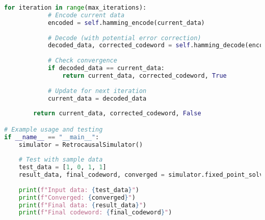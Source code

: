 \documentclass[12pt,a4paper]{article}
\begin{document}
\begin{lstlisting}[language=Python, caption=Complete Simulation Framework]
        for iteration in range(max_iterations):
            # Encode current data
            encoded = self.hamming_encode(current_data)
            
            # Decode (with potential error correction)
            decoded_data, corrected_codeword = self.hamming_decode(encoded)
            
            # Check convergence
            if decoded_data == current_data:
                return current_data, corrected_codeword, True
                
            # Update for next iteration
            current_data = decoded_data
            
        return current_data, corrected_codeword, False

# Example usage and testing
if __name__ == "__main__":
    simulator = RetrocausalSimulator()
    
    # Test with sample data
    test_data = [1, 0, 1, 1]
    result_data, final_codeword, converged = simulator.fixed_point_solver(test_data)
    
    print(f"Input data: {test_data}")
    print(f"Converged: {converged}")
    print(f"Final data: {result_data}")
    print(f"Final codeword: {final_codeword}")
\end{lstlisting}
\end{document}
